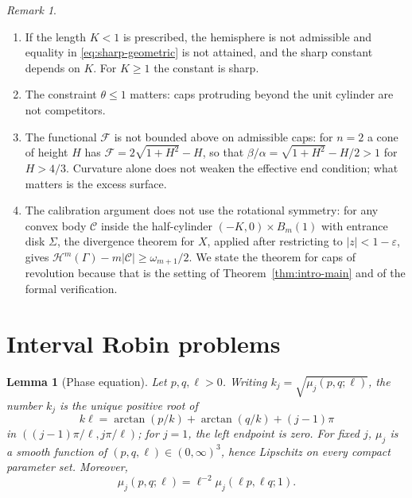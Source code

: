 \documentclass[11pt,a4paper]{article}
\numberwithin{equation}{section}
\theoremstyle{paperplain}
\newtheorem{lemma}[theorem]{Lemma}
\theoremstyle{remark}
\newtheorem{remark}[theorem]{Remark}
\newcommand{\C}{\mathcal{C}}
\newcommand{\HH}{\mathcal{H}}
\begin{document}
\begin{remark}\label{rem:cap-remarks}
\begin{enumerate}[label=(\roman*)]
\item If the length $K<1$ is prescribed, the hemisphere is not admissible
and equality in \eqref{eq:sharp-geometric} is not attained, and the sharp
constant depends on $K$. For $K\ge1$ the constant is sharp.
\item The constraint $\theta\le1$ matters: caps protruding beyond the unit
cylinder are not competitors.
\item The functional $\mathcal F$ is not bounded above on admissible caps:
for $n=2$ a cone of height $H$ has $\mathcal F=2\sqrt{1+H^2}-H$, so that
$\beta/\alpha=\sqrt{1+H^2}-H/2>1$ for $H>4/3$. Curvature alone does not
weaken the effective end condition; what matters is the excess surface.
\item The calibration argument does not use the rotational symmetry: for
any convex body $\C$ inside the half-cylinder $(-K,0)\times B_m(1)$ with
entrance disk $\Sigma$, the divergence theorem for $X$, applied after
restricting to $|z|<1-\varepsilon$, gives
$\HH^m(\Gamma)-m|\C|\ge\omega_{m+1}/2$. We state the theorem for caps of
revolution because that is the setting of Theorem~\ref{thm:intro-main} and
of the formal verification.
\end{enumerate}
\end{remark}

\section{Interval Robin problems}\label{sec:interval}

\begin{lemma}[Phase equation]\label{lem:interval}
Let $p,q,\ell>0$. Writing $k_j=\sqrt{\mu_j(p,q;\ell)}$, the number $k_j$ is
the unique positive root of
\begin{equation}\label{eq:phase}
 k\ell=\arctan(p/k)+\arctan(q/k)+(j-1)\pi
\end{equation}
in $((j-1)\pi/\ell,j\pi/\ell)$; for $j=1$, the left endpoint is zero.
For fixed $j$, $\mu_j$ is a smooth function of
$(p,q,\ell)\in(0,\infty)^3$, hence Lipschitz on every compact parameter set.
Moreover,
\begin{equation}\label{eq:interval-scaling}
 \mu_j(p,q;\ell)=\ell^{-2}\mu_j(\ell p,\ell q;1).
\end{equation}
\end{lemma}
\end{document}
